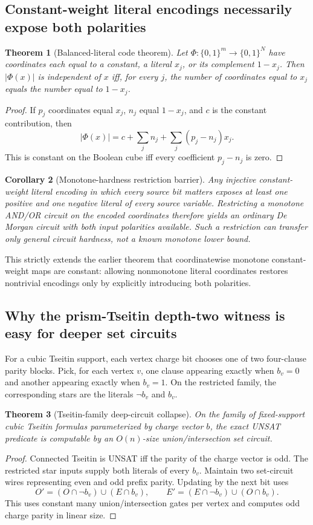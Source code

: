 \documentclass[11pt]{article}
\newtheorem{theorem}{Theorem}
\newtheorem{corollary}[theorem]{Corollary}
\begin{document}
\subsection{Constant-weight literal encodings necessarily expose both polarities}
\begin{theorem}[Balanced-literal code theorem]
Let $\Phi:\{0,1\}^m\to\{0,1\}^N$ have coordinates each equal to a constant, a literal $x_j$, or its complement $1-x_j$. Then $|\Phi(x)|$ is independent of $x$ iff, for every $j$, the number of coordinates equal to $x_j$ equals the number equal to $1-x_j$.
\end{theorem}
\begin{proof}
If $p_j$ coordinates equal $x_j$, $n_j$ equal $1-x_j$, and $c$ is the constant contribution, then
\[|\Phi(x)|=c+\sum_j n_j+\sum_j(p_j-n_j)x_j.\]
This is constant on the Boolean cube iff every coefficient $p_j-n_j$ is zero.
\end{proof}

\begin{corollary}[Monotone-hardness restriction barrier]
Any injective constant-weight literal encoding in which every source bit matters exposes at least one positive and one negative literal of every source variable. Restricting a monotone AND/OR circuit on the encoded coordinates therefore yields an ordinary De Morgan circuit with both input polarities available. Such a restriction can transfer only \emph{general} circuit hardness, not a known monotone lower bound.
\end{corollary}

This strictly extends the earlier theorem that coordinatewise monotone constant-weight maps are constant: allowing nonmonotone literal coordinates restores nontrivial encodings only by explicitly introducing both polarities.

\subsection{Why the prism-Tseitin depth-two witness is easy for deeper set circuits}
For a cubic Tseitin support, each vertex charge bit chooses one of two four-clause parity blocks. Pick, for each vertex $v$, one clause appearing exactly when $b_v=0$ and another appearing exactly when $b_v=1$. On the restricted family, the corresponding stars are the literals $\neg b_v$ and $b_v$.

\begin{theorem}[Tseitin-family deep-circuit collapse]
On the family of fixed-support cubic Tseitin formulas parameterized by charge vector $b$, the exact UNSAT predicate is computable by an $O(n)$-size union/intersection set circuit.
\end{theorem}
\begin{proof}
Connected Tseitin is UNSAT iff the parity of the charge vector is odd. The restricted star inputs supply both literals of every $b_v$. Maintain two set-circuit wires representing even and odd prefix parity. Updating by the next bit uses
\[O'=(O\cap\neg b_v)\cup(E\cap b_v),\qquad E'=(E\cap\neg b_v)\cup(O\cap b_v).\]
This uses constant many union/intersection gates per vertex and computes odd charge parity in linear size.
\end{proof}
\end{document}
